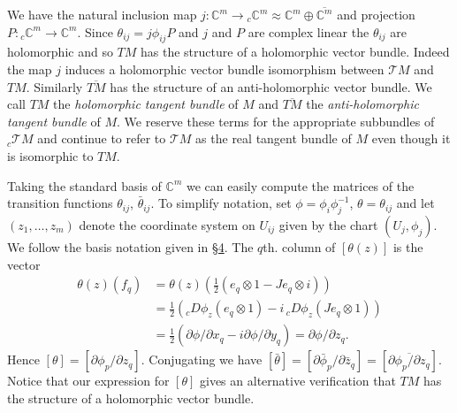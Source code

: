 We have the natural inclusion map $j:\mathbb C^m\to{}_c\mathbb C^m\approx\mathbb C^m\oplus\overline{\mathbb C^m}$ and projection $P:{}_c\mathbb C^m\to\mathbb C^m$. Since $\theta_{ij}=j\phi_{ij}P$ and $j$ and $P$ are complex linear the $\theta_{ij}$ are holomorphic and so $TM$ has the structure of a holomorphic vector bundle. Indeed the map $j$ induces a holomorphic vector bundle isomorphism between $\mathcal TM$ and $TM$. Similarly $\overline{TM}$ has the structure of an anti-holomorphic vector bundle. We call $TM$ the \emph{holomorphic tangent bundle} of $M$ and $\overline{TM}$ the \emph{anti-holomorphic tangent bundle} of $M$. We reserve these terms for the appropriate subbundles of ${}_c\mathcal TM$ and continue to refer to $\mathcal TM$ as the real tangent bundle of $M$ even though it is isomorphic to $TM$.

Taking the standard basis of $\mathbb C^m$ we can easily compute the matrices of the transition functions $\theta_{ij}$, $\bar\theta_{ij}$. To simplify notation, set $\phi=\phi_i\phi_j^{-1}$, $\theta=\theta_{ij}$ and let $(z_1,\ldots,z_m)$ denote the coordinate system on $U_{ij}$ given by the chart $(U_j,\phi_j)$. We follow the basis notation given in \hyperref[sec:5:4]{\S4}. The $q$th. column of $[\theta(z)]$ is the vector
\[
\begin{split}
\theta(z)(f_q)&=\theta(z)(\tfrac12(e_q\otimes1-Je_q\otimes i))\\
&=\tfrac12({}_cD\phi_z(e_q\otimes1)-i\,{}_cD\phi_z(Je_q\otimes1))\\
&=\tfrac12(\partial\phi/\partial x_q-i\partial\phi/\partial y_q)=\partial\phi/\partial z_q.
\end{split}
\]
Hence $[\theta]=[\partial\phi_p/\partial z_q]$. Conjugating we have $[\bar\theta]=[\partial\bar\phi_p/\partial\bar z_q]=[\overline{\partial\phi_p/\partial z_q}]$. Notice that our expression for $[\theta]$ gives an alternative verification that $TM$ has the structure of a holomorphic vector bundle.

